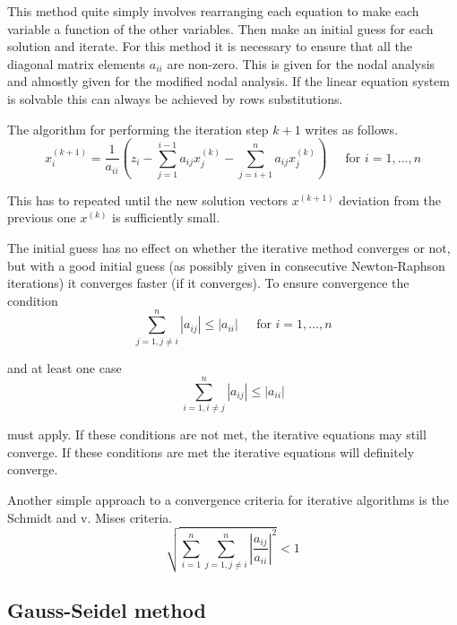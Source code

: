 This method quite simply involves rearranging each equation to make
each variable a function of the other variables.  Then make an initial
guess for each solution and iterate.  For this method it is necessary
to ensure that all the diagonal matrix elements $a_{ii}$ are non-zero.
This is given for the nodal analysis and almostly given for the
modified nodal analysis.  If the linear equation system is solvable
this can always be achieved by rows substitutions.

\addvspace{12pt}

The algorithm for performing the iteration step $k + 1$ writes as
follows.
\begin{equation}
x_{i}^{(k+1)} = \dfrac{1}{a_{ii}}\left(z_i - \sum_{j=1}^{i-1} a_{ij}x_{j}^{(k)} - \sum_{j=i+1}^{n} a_{ij}x_{j}^{(k)}\right)
\;\;\;\; \textrm{ for } i = 1, \ldots, n
\end{equation}

This has to repeated until the new solution vectors $x^{(k+1)}$
deviation from the previous one $x^{(k)}$ is sufficiently small.

\addvspace{12pt}

The initial guess has no effect on whether the iterative method
converges or not, but with a good initial guess (as possibly given in
consecutive Newton-Raphson iterations) it converges faster (if it
converges).  To ensure convergence the condition
\begin{equation}
\sum_{j = 1, j \ne i}^{n} \left|a_{ij}\right| \le \left|a_{ii}\right|
\;\;\;\; \textrm{ for } i = 1, \ldots, n
\end{equation}

and at least one case
\begin{equation}
\sum_{i = 1, i \ne j}^{n} \left|a_{ij}\right| \le \left|a_{ii}\right|
\end{equation}

must apply.  If these conditions are not met, the iterative equations
may still converge.  If these conditions are met the iterative
equations will definitely converge.

\addvspace{12pt}

Another simple approach to a convergence criteria for iterative
algorithms is the Schmidt and v. Mises criteria.
\begin{equation}
\sqrt{\sum_{i = 1}^n \sum_{j = 1, j \ne i}^n \left|\dfrac{a_{ij}}{a_{ii}}\right|^2} < 1
\end{equation}

\subsection{Gauss-Seidel method}

